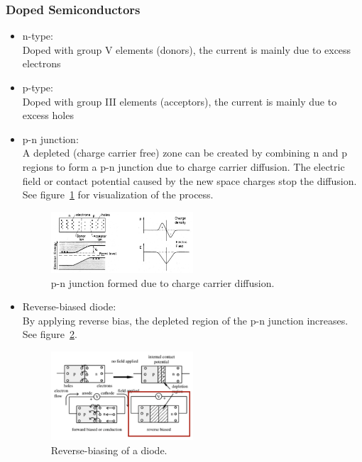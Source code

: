 \subsubsection{Doped Semiconductors}
\begin{itemize}
    \item n-type:\\
    Doped with group V elements (donors), the current is mainly due to excess electrons
    \item p-type:\\
    Doped with group III elements (acceptors), the current is mainly due to excess holes
    \item p-n junction:\\
    A depleted (charge carrier free) zone can be created by combining n and p regions to form a p-n junction due to charge carrier diffusion. The electric field or contact potential caused by the new space charges stop the diffusion. See figure~\ref{fig:pn_junction_formation} for visualization of the process.
    \begin{figure}[ht]
        \centering
        \includegraphics[width=0.5\textwidth]{images/pn_junction_formation.png}
        \caption{p-n junction formed due to charge carrier diffusion.}
        \label{fig:pn_junction_formation}
    \end{figure}
    \item Reverse-biased diode:\\
    By applying reverse bias, the depleted region of the p-n junction increases. See figure~\ref{fig:reverse_bias_diode}. 
    \begin{figure}[ht]
        \centering
        \includegraphics[width=0.5\textwidth]{images/reverse_bias_diode.png}
        \caption{Reverse-biasing of a diode.}
        \label{fig:reverse_bias_diode}
    \end{figure}
\end{itemize}
